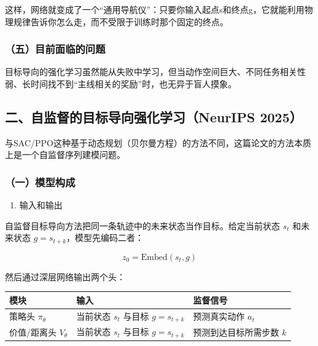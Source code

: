这样，网络就变成了一个``通用导航仪''：只要你输入起点s和终点g，它就能利用物理规律告诉你怎么走，而不受限于训练时那个固定的终点。

\hypertarget{ux4e94ux76eeux524dux9762ux4e34ux7684ux95eeux9898}{%
\subsubsection{（五）目前面临的问题}\label{ux4e94ux76eeux524dux9762ux4e34ux7684ux95eeux9898}}

目标导向的强化学习虽然能从失败中学习，但当动作空间巨大、不同任务相关性弱、长时间找不到``主线相关的奖励''时，也无异于盲人摸象。

\hypertarget{ux4e8cux81eaux76d1ux7763ux7684ux76eeux6807ux5bfcux5411ux5f3aux5316ux5b66ux4e60neurips-2025}{%
\subsection{二、自监督的目标导向强化学习（NeurIPS 2025）}\label{ux4e8cux81eaux76d1ux7763ux7684ux76eeux6807ux5bfcux5411ux5f3aux5316ux5b66ux4e60neurips-2025}}

与SAC/PPO这种基于动态规划（贝尔曼方程）的方法不同，这篇论文的方法本质上是一个自监督序列建模问题。

\hypertarget{ux4e00ux6a21ux578bux6784ux6210}{%
\subsubsection{（一）模型构成}\label{ux4e00ux6a21ux578bux6784ux6210}}

\begin{enumerate}
\def\labelenumi{\arabic{enumi}.}
\tightlist
\item
  输入和输出
\end{enumerate}

自监督目标导向方法把同一条轨迹中的未来状态当作目标。给定当前状态 \(s_t\) 和未来状态 \(g=s_{t+k}\)，模型先编码二者：

\[
z_0=\mathrm{Embed}(s_t,g)
\]

然后通过深层网络输出两个头：

\begin{longtable}[]{@{}
  >{\raggedright\arraybackslash}p{}
  >{\raggedright\arraybackslash}p{}
  >{\raggedright\arraybackslash}p{}@{}}
\toprule
模块 & 输入 & 监督信号 \\
\midrule
\endhead
策略头 \(\pi_\theta\) & 当前状态 \(s_t\) 与目标 \(g=s_{t+k}\) & 预测真实动作 \(a_t\) \\
价值/距离头 \(V_\theta\) & 当前状态 \(s_t\) 与目标 \(g=s_{t+k}\) & 预测到达目标所需步数 \(k\) \\
\bottomrule
\end{longtable}

